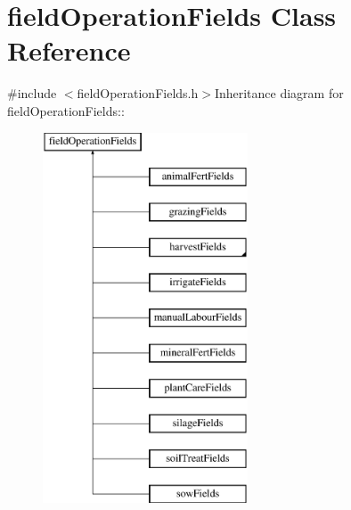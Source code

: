 \hypertarget{classfield_operation_fields}{
\section{fieldOperationFields Class Reference}
\label{classfield_operation_fields}
}


{\ttfamily \#include $<$fieldOperationFields.h$>$}Inheritance diagram for fieldOperationFields::\begin{figure}[H]
\begin{center}
\leavevmode
\includegraphics[height=11cm]{classfield_operation_fields}
\end{center}
\end{figure}
